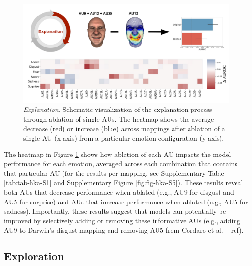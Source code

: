 \documentclass[12pt,american,a4paper,oneside,]{memoir} %
\begin{document}
\begin{figure}
\centering
\includegraphics{_bookdown_files/hypothesis-kernel-analysis-files/figures/figure_5.pdf}
\caption{\label{fig:fig-hka-5}\emph{Explanation}. Schematic visualization of the explanation process through ablation of single AUs. The heatmap shows the average decrease (red) or increase (blue) across mappings after ablation of a single AU (x-axis) from a particular emotion configuration (y-axis).}
\end{figure}



The heatmap in Figure \ref{fig:fig-hka-5} shows how ablation of each AU impacts the model performance for each emotion, averaged across each combination that contains that particular AU (for the results per mapping, see Supplementary Table \ref{tab:tab-hka-S1} and Supplementary Figure \ref{fig:fig-hka-S5}). These results reveal both AUs that decrease performance when ablated (e.g., AU9 for disgust and AU5 for surprise) and AUs that increase performance when ablated (e.g., AU5 for sadness). Importantly, these results suggest that models can potentially be improved by selectively adding or removing these informative AUs (e.g., adding AU9 to Darwin's disgust mapping and removing AU5 from Cordaro et al.~- ref).

\hypertarget{exploration}{%
\subsection{Exploration}\label{exploration}}
\end{document}
